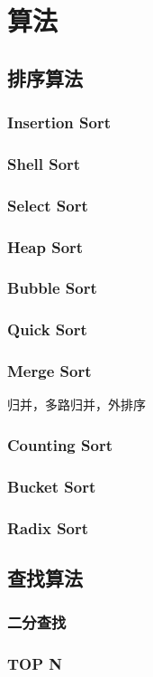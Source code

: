 \chapter{算法}

\section{排序算法}

\subsection{Insertion Sort}

\subsection{Shell Sort}

\subsection{Select Sort}

\subsection{Heap Sort}

\subsection{Bubble Sort}

\subsection{Quick Sort}

\subsection{Merge Sort}

归并，多路归并，外排序

\subsection{Counting Sort}

\subsection{Bucket Sort}

\subsection{Radix Sort}

\section{查找算法}

\subsection{二分查找}

\subsection{TOP N}
